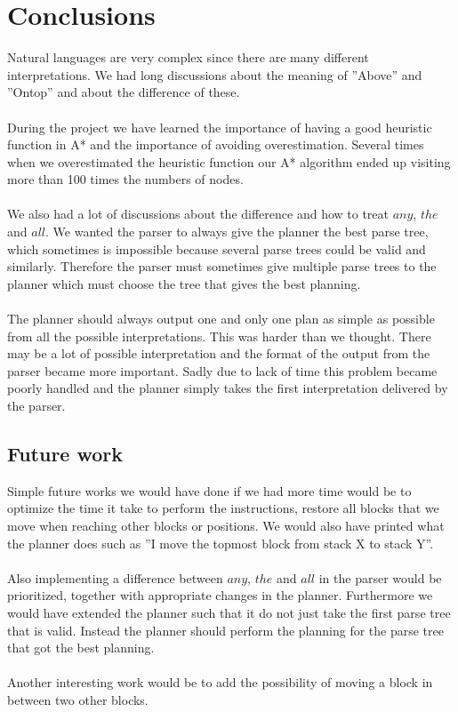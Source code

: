 \chapter{Conclusions}
Natural languages are very complex since there are many different
interpretations. We had long discussions about the meaning of ''Above'' and
''Ontop'' and about the difference of these.  
\\\\
During the project we have learned the importance of having a good heuristic
function in A* and the importance of avoiding overestimation.  Several times
when we overestimated the heuristic function our A* algorithm ended up visiting
more than 100 times the numbers of nodes. 
\\\\
We also had a lot of discussions about the difference and how to treat $any$,
$the$ and $all$. We wanted the parser to always give the planner the best parse
tree, which sometimes is impossible because several parse trees could be valid
and similarly. Therefore the parser must sometimes give multiple parse trees to
the planner which must choose the tree that gives the best planning.
\\\\
The planner should always output one and only one plan as simple as
possible from all the possible interpretations. This was harder than we thought. 
There may be a lot of possible interpretation and the format of the
output from the parser became more important. Sadly due to lack of time this
problem became poorly handled and the planner simply takes the first
interpretation delivered by the parser. 
\section{Future work}
Simple future works we would have done if we had more time would be to optimize
the time it take to perform the instructions, restore all blocks that we move
when reaching other blocks or positions. We would also have printed what the
planner does such as ''I move the topmost block from stack X to stack Y''.
\\\\
Also implementing a difference between $any$, $the$ and $all$ in the parser
would be prioritized, together with appropriate changes in the planner.
Furthermore we would have extended the planner such that it do not just take the
first parse tree that is valid. Instead the planner should perform the planning
for the parse tree that got the best planning. 
\\\\
Another interesting work would be to add the possibility of moving a block
in between two other blocks. 
